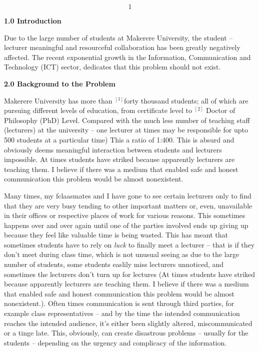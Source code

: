 \documentclass{article} %
\begin{document}


\noindent 

\noindent 

\noindent 

\noindent 
\[1\] 


\noindent \textbf{1.0 Introduction}

\noindent Due to the large number of students at Makerere University, the student -- lecturer meaningful and resourceful collaboration has been greatly negatively affected. The recent exponential growth in the Information, Communication and Technology (ICT) sector, dedicates that this problem should not exist.

\noindent \textbf{2.0 Background to the Problem}

\noindent Makerere University has more than ${}^{[1] }$forty thousand students; all of which are pursuing different levels of education, from certificate level to ${}^{[2]}$ Doctor of Philosophy (PhD) Level. Compared with the much less\textit{ }number of teaching staff (lecturers) at the university -- one lecturer at times may be responsible for upto 500 students at a particular time) This a ratio of 1:400. This is absurd and obviously deems meaningful interaction between students and lecturers impossible. At times students have striked because apparently lecturers are teaching them. I believe if there was a medium that enabled safe and honest communication this problem would be almost nonexistent. 

\noindent Many times, my fclaasmates and I have gone to see certain lecturers only to find that they are very busy tending to other important matters or, even, unavailable in their offices or respective places of work for various reasons. This sometimes happens over and over again until one of the parties involved ends up giving up because they feel like valuable time is being wasted. This has meant that sometimes students have to rely on \textit{luck }to finally meet a lecturer -- that is if they don't meet during class time, which is not unusual seeing as due to the large number of students, some students easlily miss lecturers unnoticed, and sometimes the lecturers don't turn up for lectures (At times students have striked because apparently lecturers are teaching them. I believe if there was a medium that enabled safe and honest communication this problem would be almost nonexistent.). Often times communication is sent through third parties, for example class representatives -- and by the time the intended communication reaches the intended audience, it's either been slightly altered, miscommunicated or a tinge late. This, obviously, can create disastrous problems -- usually for the students -- depending on the urgency and complicacy of the information. 
\end{document}
